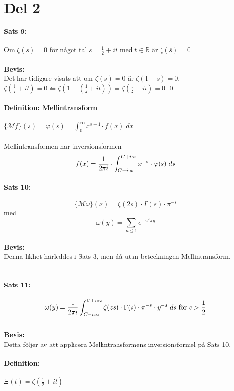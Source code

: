 \documentclass[a4paper,twoside]{article}%
\begin{document}
\section*{Del 2}
\paragraph{Sats 9:} Om $\zeta(s) = 0$ för något tal $s = \frac 1 2 + it$ med $t \in \mathbb{R}$ är $\zeta(\overline{s}) = 0$ \\
\\
{\bf Bevis:}\\
Det har tidigare visats att om $\zeta(s) = 0$ är $\zeta(1 - s) = 0$. $\zeta(\frac 1 2 + it) = 0 \Leftrightarrow 
\zeta(1 - (\frac 1 2 + it)) = \zeta(\frac 1 2 - it) = 0$
\hfill \qed

\paragraph{Definition: Mellintransform} $\{\mathcal{M}f\}(s) = \varphi(s) = \int_0^\infty x^{s - 1} \cdot f(x) \; dx $ \\
\\
Mellintransformen har inversionsformen
\[
	f(x) = \frac {1} {2 \pi i} \cdot \int_{C - i \infty}^{C + i \infty}
		x^{-s} \cdot \varphi(s) \; ds
 \]

\paragraph{Sats 10:} 
\[
	\{\mathcal{M} \omega \} (x) = \zeta(2s) \cdot \Gamma(s) \cdot \pi^{-s}
\]
med 
\[
	\omega(y) = \sum\limits_{n \leq 1} e^{-n^2\pi y}
\]
\\
{\bf Bevis:} \\ 
Denna likhet härleddes i Sats 3, men då utan beteckningen Mellintransform.\\
\\
\paragraph{Sats 11:} 
\[
	\omega(y) = \frac {1} {2\pi i} \int_{C - i \infty}^{C + i \infty} \zeta(zs) \cdot \Gamma(s) \cdot \pi^{-s} \cdot
		y^{-s} \; ds \text{ för } c > \frac 1 2
\] 
\\
{\bf Bevis:}\\
Detta följer av att applicera Mellintransformens inversionsformel på Sats 10.\\

\paragraph{Definition:} $\Xi(t) = \zeta(\frac 1 2 + it)$ \\
\\
\newcommand{\helper}[1] {
	\int_#1^\infty (t^2 + \frac 1 4)^{-1}
}
\newcommand{\twelve}[1][0] {
	\helper{#1} \cdot \cos(xt) \; dt
}
\end{document}
